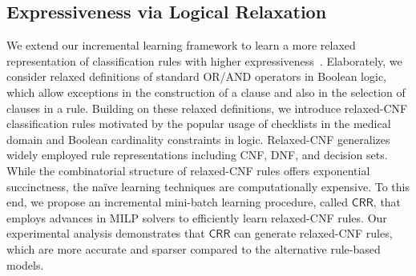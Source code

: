\subsection*{Expressiveness via Logical Relaxation}
We extend our incremental learning framework to learn a more relaxed representation of classification rules with higher expressiveness~\cite{GMM2020}. Elaborately, we consider relaxed definitions of standard OR/AND operators in Boolean logic, which allow exceptions in the construction of a clause and also in the selection of clauses in a rule. Building on these relaxed definitions, we introduce relaxed-CNF classification rules motivated by the popular usage of checklists in the medical domain and Boolean cardinality constraints in logic. Relaxed-CNF generalizes widely employed rule representations including CNF, DNF, and decision sets. While the combinatorial structure of relaxed-CNF rules offers exponential succinctness, the na\"ive learning techniques are computationally expensive. To this end, we propose an incremental mini-batch learning procedure, called $ \mathsf{CRR} $, that employs advances in MILP solvers to efficiently learn relaxed-CNF rules. Our experimental analysis demonstrates that $ \mathsf{CRR} $ can generate relaxed-CNF rules, which are more accurate and sparser compared to the alternative rule-based models.








